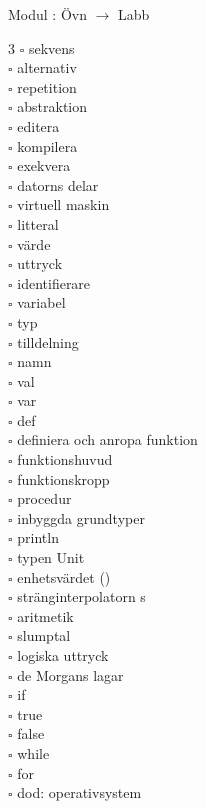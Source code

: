 
    Modul : Övn  $\rightarrow$ Labb 
    \begin{multicols}{3}\SlideFontTiny
    $\square$ sekvens \\
$\square$ alternativ \\
$\square$ repetition \\
$\square$ abstraktion \\
$\square$ editera \\
$\square$ kompilera \\
$\square$ exekvera \\
$\square$ datorns delar \\
$\square$ virtuell maskin \\
$\square$ litteral \\
$\square$ värde \\
$\square$ uttryck \\
$\square$ identifierare \\
$\square$ variabel \\
$\square$ typ \\
$\square$ tilldelning \\
$\square$ namn \\
$\square$ val \\
$\square$ var \\
$\square$ def \\
$\square$ definiera och anropa funktion \\
$\square$ funktionshuvud \\
$\square$ funktionskropp \\
$\square$ procedur \\
$\square$ inbyggda grundtyper \\
$\square$ println \\
$\square$ typen Unit \\
$\square$ enhetsvärdet () \\
$\square$ stränginterpolatorn s \\
$\square$ aritmetik \\
$\square$ slumptal \\
$\square$ logiska uttryck \\
$\square$ de Morgans lagar \\
$\square$ if \\
$\square$ true \\
$\square$ false \\
$\square$ while \\
$\square$ for \\
$\square$ dod: operativsystem \\
    \end{multicols}
    